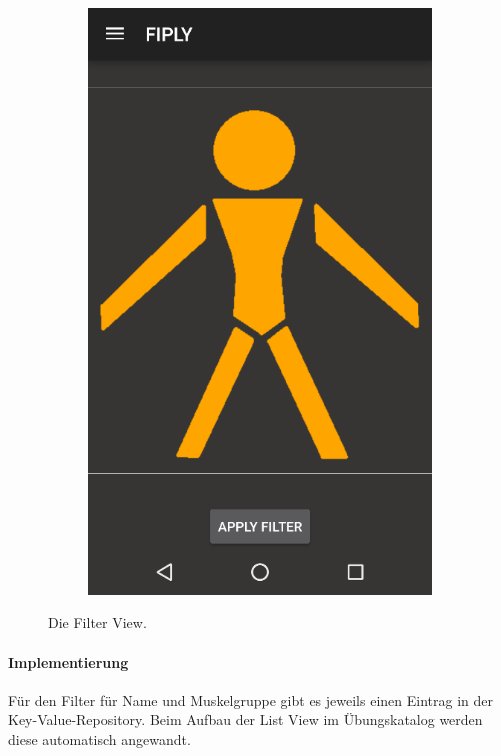 \documentclass[FIPLY_base.tex]{subfiles}
\begin{document}
\begin{figure}[H]
	\begin{subfigure}[b]{0.3\textwidth}
	\includegraphics[scale=0.55]{img/Uebungskatalog_filter}
	\end{subfigure}
	\hfil
	\caption{Die Filter View.}
\end{figure}
\newpage

\paragraph{Implementierung}
Für den Filter für Name und Muskelgruppe gibt es jeweils einen Eintrag in der Key-Value-Repository.
Beim Aufbau der List View im Übungskatalog werden diese automatisch angewandt.
\end{document}
